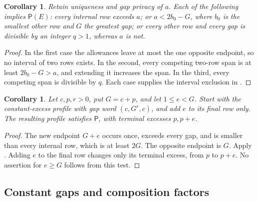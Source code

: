 \documentclass[11pt,a4paper]{amsart}
\numberwithin{equation}{section}
\theoremstyle{plain}
\newtheorem{corollary}[theorem]{Corollary}
\theoremstyle{definition}
\begin{document}
\begin{corollary}\label{cor:arithmetic-tests}
Retain uniqueness and gap privacy of \(a\).  Each of the following implies \(\mathsf P(E)\): every internal row exceeds \(a\); or \(a<2b_0-G\), where \(b_0\) is the smallest other row and \(G\) the greatest gap; or every other row and every gap is divisible by an integer \(q>1\), whereas \(a\) is not.
\end{corollary}
\begin{proof}
In the first case the allowances leave at most the one opposite endpoint, so no interval of two rows exists.  In the second, every competing two-row span is at least \(2b_0-G>a\), and extending it increases the span.  In the third, every competing span is divisible by \(q\).  Each case supplies the interval exclusion in .
\end{proof}

\begin{corollary}\label{cor:stretched-strip}
Let \(c,p,r>0\), put \(G=c+p\), and let \(1\le e<G\).  Start with the constant-excess profile with gap word \((c,G^r,c)\), and add \(e\) to its final row only.  The resulting profile satisfies \(\mathsf P\), with terminal excesses \(p,p+e\).
\end{corollary}
\begin{proof}
The new endpoint \(G+e\) occurs once, exceeds every gap, and is smaller than every internal row, which is at least \(2G\).  The opposite endpoint is \(G\).  Apply .  Adding \(e\) to the final row changes only its terminal excess, from \(p\) to \(p+e\).  No assertion for \(e\ge G\) follows from this test.
\end{proof}

\subsection{Constant gaps and composition factors}
\end{document}
